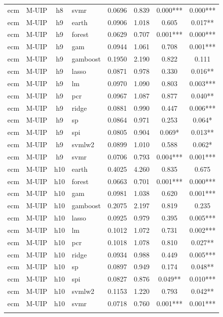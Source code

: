 \begin{ThreePartTable}
\begin{longtable}[t]{llclcccc}
ecm & M-UIP & h8 & svmr & 0.0696 & 0.839 & 0.000*** & 0.000***\\
\addlinespace
ecm & M-UIP & h9 & earth & 0.0906 & 1.018 & 0.605 & 0.017**\\
ecm & M-UIP & h9 & forest & 0.0629 & 0.707 & 0.001*** & 0.000***\\
ecm & M-UIP & h9 & gam & 0.0944 & 1.061 & 0.708 & 0.001***\\
ecm & M-UIP & h9 & gamboost & 0.1950 & 2.190 & 0.822 & 0.111\\
ecm & M-UIP & h9 & lasso & 0.0871 & 0.978 & 0.330 & 0.016**\\
ecm & M-UIP & h9 & lm & 0.0970 & 1.090 & 0.803 & 0.003***\\
ecm & M-UIP & h9 & pcr & 0.0967 & 1.087 & 0.877 & 0.040**\\
ecm & M-UIP & h9 & ridge & 0.0881 & 0.990 & 0.447 & 0.006***\\
ecm & M-UIP & h9 & sp & 0.0864 & 0.971 & 0.253 & 0.064*\\
ecm & M-UIP & h9 & spi & 0.0805 & 0.904 & 0.069* & 0.013**\\
ecm & M-UIP & h9 & svmlw2 & 0.0899 & 1.010 & 0.588 & 0.062*\\
ecm & M-UIP & h9 & svmr & 0.0706 & 0.793 & 0.004*** & 0.001***\\
\addlinespace
ecm & M-UIP & h10 & earth & 0.4025 & 4.260 & 0.835 & 0.675\\
ecm & M-UIP & h10 & forest & 0.0663 & 0.701 & 0.001*** & 0.000***\\
ecm & M-UIP & h10 & gam & 0.0981 & 1.038 & 0.620 & 0.001***\\
ecm & M-UIP & h10 & gamboost & 0.2075 & 2.197 & 0.819 & 0.235\\
ecm & M-UIP & h10 & lasso & 0.0925 & 0.979 & 0.395 & 0.005***\\
ecm & M-UIP & h10 & lm & 0.1012 & 1.072 & 0.731 & 0.002***\\
ecm & M-UIP & h10 & pcr & 0.1018 & 1.078 & 0.810 & 0.027**\\
ecm & M-UIP & h10 & ridge & 0.0934 & 0.988 & 0.449 & 0.005***\\
ecm & M-UIP & h10 & sp & 0.0897 & 0.949 & 0.174 & 0.048**\\
ecm & M-UIP & h10 & spi & 0.0827 & 0.876 & 0.049** & 0.010***\\
ecm & M-UIP & h10 & svmlw2 & 0.1153 & 1.220 & 0.793 & 0.042**\\
ecm & M-UIP & h10 & svmr & 0.0718 & 0.760 & 0.001*** & 0.001***\\
\addlinespace

\end{longtable}
\end{ThreePartTable}

